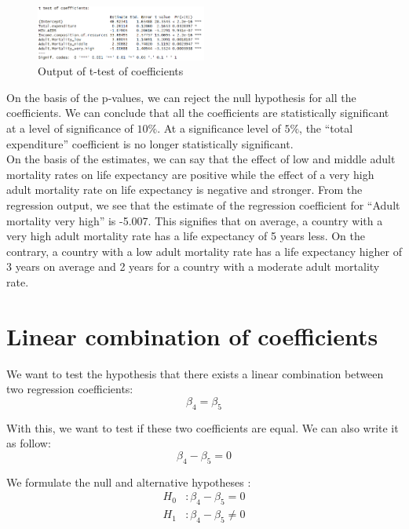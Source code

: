 \begin{figure}[H]
	\centering
	\includegraphics[width=0.5\textwidth]{figures/hypothesis_testing/test_t_coefficients_homoskedasticity.PNG}
	\caption{Output of t-test of coefficients}
\end{figure}

On the basis of the p-values, we can reject the null hypothesis for all the coefficients. We can conclude that all the coefficients are statistically significant at a level of significance of $10\%$. At a significance level of $5\%$, the “total expenditure” coefficient is no longer statistically significant. \\

On the basis of the estimates, we can say that the effect of low and middle adult mortality rates on life expectancy are positive while the effect of a very high adult mortality rate on life expectancy is negative and stronger. From the regression output, we see that the estimate of the regression coefficient for “Adult mortality very high” is -5.007. This signifies that on average, a country with a very high adult mortality rate has a life expectancy of 5 years less. On the contrary, a country with a low  adult mortality rate has a life expectancy higher of 3 years on average and 2 years for a country with a moderate adult mortality rate. 

\section{Linear combination  of coefficients}

 We want to test the hypothesis that there exists a linear combination between two regression coefficients: 
 \begin{equation*}
     \beta_4 = \beta_5
 \end{equation*} 

 With this, we want to test if these two coefficients are equal. We can also write it as follow: \begin{equation*}
     \beta_4 - \beta_5 = 0
 \end{equation*}

We formulate the null and alternative hypotheses : 
\begin{align*}
	H_0&: \beta_4 - \beta_5 = 0 \\
	H_1&: \beta_4 - \beta_5 \neq 0
\end{align*}

